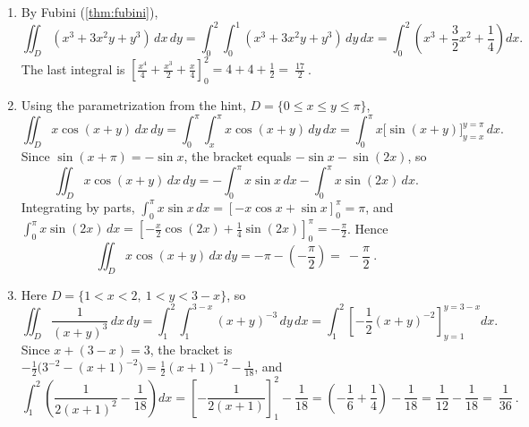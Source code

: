 \begin{exercisesolution}
\label{sol:curve_length_polar_and_vector_integral}
\begin{enumerate}[label=\textbf{(\alph*)}]
  \item By Fubini (\cref{thm:fubini}),
    \[\iint_D (x^3+3x^2y+y^3)\,dx\,dy = \int_0^2\int_0^1 (x^3+3x^2y+y^3)\,dy\,dx
      = \int_0^2\left(x^3+\frac32x^2+\frac14\right)dx.\]
    The last integral is
    $\left[\tfrac{x^4}{4}+\tfrac{x^3}{2}+\tfrac{x}{4}\right]_0^2 = 4+4+\tfrac12
    = \boxed{\ \tfrac{17}{2}\ }$.
  \item Using the parametrization from the hint, $D=\{0\leq x\leq y\leq\pi\}$,
    \[\iint_D x\cos(x+y)\,dx\,dy = \int_0^\pi\int_x^\pi x\cos(x+y)\,dy\,dx
      = \int_0^\pi x\big[\sin(x+y)\big]_{y=x}^{y=\pi}\,dx.\]
    Since $\sin(x+\pi) = -\sin x$, the bracket equals $-\sin x - \sin(2x)$, so
    \[\iint_D x\cos(x+y)\,dx\,dy = -\int_0^\pi x\sin x\,dx - \int_0^\pi x\sin(2x)\,dx.\]
    Integrating by parts, $\int_0^\pi x\sin x\,dx = [-x\cos x+\sin x]_0^\pi = \pi$, and
    $\int_0^\pi x\sin(2x)\,dx = \left[-\tfrac{x}{2}\cos(2x)+\tfrac14\sin(2x)\right]_0^\pi
    = -\tfrac\pi2$. Hence
    \[\iint_D x\cos(x+y)\,dx\,dy = -\pi - \left(-\frac\pi2\right) = \boxed{\ -\frac\pi2\ }.\]
  \item Here $D = \{1<x<2,\ 1<y<3-x\}$, so
    \[\iint_D \frac{1}{(x+y)^3}\,dx\,dy = \int_1^2\int_1^{3-x} (x+y)^{-3}\,dy\,dx
      = \int_1^2 \left[-\frac12(x+y)^{-2}\right]_{y=1}^{y=3-x}dx.\]
    Since $x+(3-x)=3$, the bracket is $-\tfrac12\big(3^{-2}-(x+1)^{-2}\big)
    = \tfrac12(x+1)^{-2} - \tfrac1{18}$, and
    \[\int_1^2\left(\frac{1}{2(x+1)^2}-\frac1{18}\right)dx
      = \left[-\frac{1}{2(x+1)}\right]_1^2 - \frac1{18}
      = \left(-\frac16+\frac14\right) - \frac1{18} = \frac1{12}-\frac1{18}
      = \boxed{\ \frac1{36}\ }.\]
\end{enumerate}
\end{exercisesolution}


